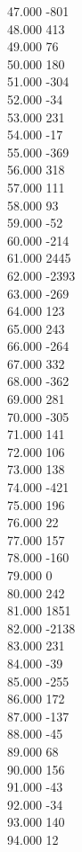 { 47.000	-801 \\
 48.000	413 \\
 49.000	76 \\
 50.000	180 \\
 51.000	-304 \\
 52.000	-34 \\
 53.000	231 \\
 54.000	-17 \\
 55.000	-369 \\
 56.000	318 \\
 57.000	111 \\
 58.000	93 \\
 59.000	-52 \\
 60.000	-214 \\
 61.000	2445 \\
 62.000	-2393 \\
 63.000	-269 \\
 64.000	123 \\
 65.000	243 \\
 66.000	-264 \\
 67.000	332 \\
 68.000	-362 \\
 69.000	281 \\
 70.000	-305 \\
 71.000	141 \\
 72.000	106 \\
 73.000	138 \\
 74.000	-421 \\
 75.000	196 \\
 76.000	22 \\
 77.000	157 \\
 78.000	-160 \\
 79.000	0 \\
 80.000	242 \\
 81.000	1851 \\
 82.000	-2138 \\
 83.000	231 \\
 84.000	-39 \\
 85.000	-255 \\
 86.000	172 \\
 87.000	-137 \\
 88.000	-45 \\
 89.000	68 \\
 90.000	156 \\
 91.000	-43 \\
 92.000	-34 \\
 93.000	140 \\
 94.000	12 \\
}
